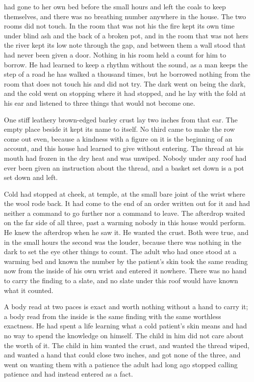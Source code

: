  had gone to her own bed before the small hours and left the coals to keep themselves, and there was no breathing number anywhere in the house. The two rooms did not touch. In the room that was not his the fire kept its own time under blind ash and the back of a broken pot, and in the room that was not hers the river kept its low note through the gap, and between them a wall stood that had never been given a door. Nothing in his room held a count for him to borrow. He had learned to keep a rhythm without the sound, as a man keeps the step of a road he has walked a thousand times, but he borrowed nothing from the room that does not touch his and did not try. The dark went on being the dark, and the cold went on stopping where it had stopped, and he lay with the fold at his ear and listened to three things that would not become one.

One stiff leathery brown-edged barley crust lay two inches from that ear. The empty place beside it kept its name to itself. No third came to make the row come out even, because a kindness with a figure on it is the beginning of an account, and this house had learned to give without entering. The thread at his mouth had frozen in the dry heat and was unwiped. Nobody under any roof had ever been given an instruction about the thread, and a basket set down is a pot set down and left.

Cold had stopped at cheek, at temple, at the small bare joint of the wrist where the wool rode back. It had come to the end of an order written out for it and had neither a command to go further nor a command to leave. The afterdrop waited on the far side of all three, past a warming nobody in this house would perform. He knew the afterdrop when he saw it. He wanted the crust. Both were true, and in the small hours the second was the louder, because there was nothing in the dark to set the eye other things to count. The adult who had once stood at a warming bed and known the number by the patient's skin took the same reading now from the inside of his own wrist and entered it nowhere. There was no hand to carry the finding to a slate, and no slate under this roof would have known what it counted.

A body read at two paces is exact and worth nothing without a hand to carry it; a body read from the inside is the same finding with the same worthless exactness. He had spent a life learning what a cold patient's skin means and had no way to spend the knowledge on himself. The child in him did not care about the worth of it. The child in him wanted the crust, and wanted the thread wiped, and wanted a hand that could close two inches, and got none of the three, and went on wanting them with a patience the adult had long ago stopped calling patience and had instead entered as a fact.

